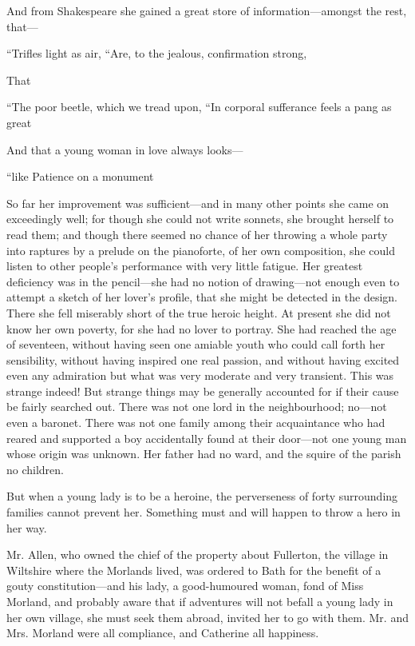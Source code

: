 And from Shakespeare she gained a great store of information---amongst the rest, that---

“Trifles light as air,\crlf
“Are, to the jealous, confirmation strong,\crlf
{}

That

“The poor beetle, which we tread upon,\crlf
“In corporal sufferance feels a pang as great\crlf
{}

And that a young woman in love always looks---

“like Patience on a monument\crlf
{}

So far her improvement was sufficient---and in many other points she came on exceedingly well; for though she could not write sonnets, she brought herself to read them; and though there seemed no chance of her throwing a whole party into raptures by a prelude on the pianoforte, of her own composition, she could listen to other people's performance with very little fatigue. Her greatest deficiency was in the pencil---she had no notion of drawing---not enough even to attempt a sketch of her lover's profile, that she might be detected in the design. There she fell miserably short of the true heroic height. At present she did not know her own poverty, for she had no lover to portray. She had reached the age of seventeen, without having seen one amiable youth who could call forth her sensibility, without having inspired one real passion, and without having excited even any admiration but what was very moderate and very transient. This was strange indeed! But strange things may be generally accounted for if their cause be fairly searched out. There was not one lord in the neighbourhood; no---not even a baronet. There was not one family among their acquaintance who had reared and supported a boy accidentally found at their door---not one young man whose origin was unknown. Her father had no ward, and the squire of the parish no children.

But when a young lady is to be a heroine, the perverseness of forty surrounding families cannot prevent her. Something must and will happen to throw a hero in her way.

Mr. Allen, who owned the chief of the property about Fullerton, the village in Wiltshire where the Morlands lived, was ordered to Bath for the benefit of a gouty constitution---and his lady, a good-humoured woman, fond of Miss Morland, and probably aware that if adventures will not befall a young lady in her own village, she must seek them abroad, invited her to go with them. Mr. and Mrs. Morland were all compliance, and Catherine all happiness.

